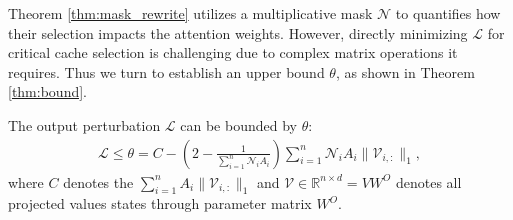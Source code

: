 Theorem \ref{thm:mask_rewrite} utilizes a multiplicative mask $\mathcal{N}$ to  quantifies how their selection impacts the attention weights.
However, directly minimizing $\mathcal{L}$ for critical cache selection is challenging due to complex matrix operations it requires. Thus we turn to establish an upper bound $\theta$, as shown in Theorem \ref{thm:bound}.
\begin{theorem}
	\label{thm:bound}
	The output perturbation $\mathcal{L}$ can be bounded by $\theta$:
	{\small
		\begin{align}
		\mathcal{L} \leq \theta =  C -  \left( 2- \frac{1}{\sum\nolimits_{i=1}^{n} \mathcal{N}_i A_{i}} \right) \sum\nolimits_{i=1}^{n}  \mathcal{N}_i A_i \lVert \boldsymbol{\mathcal{V}}_{i,:} \rVert_1  ,
	\end{align}
	}
	where $C$ denotes the $\sum\nolimits_{i=1}^{n} A_i \lVert \boldsymbol{\mathcal{V}}_{i,:} \rVert_1$ and $\boldsymbol{\mathcal{V}} \in \mathbb{R}^{n \times d} = VW^O$ denotes all projected values states through parameter matrix $W^O$.
\end{theorem}

